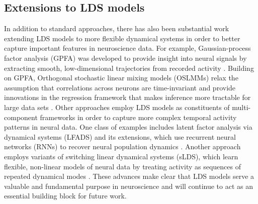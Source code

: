 \subsection{Extensions to LDS models}
\label{sec:bestlds:background:extensions}

In addition to standard approaches, there has also been substantial work extending LDS models to more flexible dynamical systems in order to better capture important features in neuroscience data. For example, Gaussian-process factor analysis (GPFA) was developed to provide insight into neural signals by extracting smooth, low-dimensional trajectories from recorded activity \cite{yu_gaussian-process_2009}. Building on GPFA, Orthogonal stochastic linear mixing models (OSLMMs) relax the assumption that correlations across neurons are time-invariant and provide innovations in the regression framework that makes inference more tractable for large data sets \cite{meng_bayesian_2022}. Other approaches employ LDS models as constituents of multi-component frameworks in order to capture more complex temporal activity patterns in neural data. One class of examples includes latent factor analysis via dynamical systems (LFADS) and its extensions, which use recurrent neural networks (RNNs) to recover neural population dynamics \cite{pandarinath_inferring_2018, prince_parallel_2021, zhu_deep_2022}. Another approach employs variants of switching linear dynamical systems (sLDS), which learn flexible, non-linear models of neural data by treating activity as sequences of repeated dynamical modes \cite{linderman_recurrent_2016, nassar_tree-structured_2019, zoltowski_general_2020, mudrik_decomposed_2022, wang_bayesian_2022}. These advances make clear that LDS models serve a valuable and fundamental purpose in neuroscience and will continue to act as an essential building block for future work. 